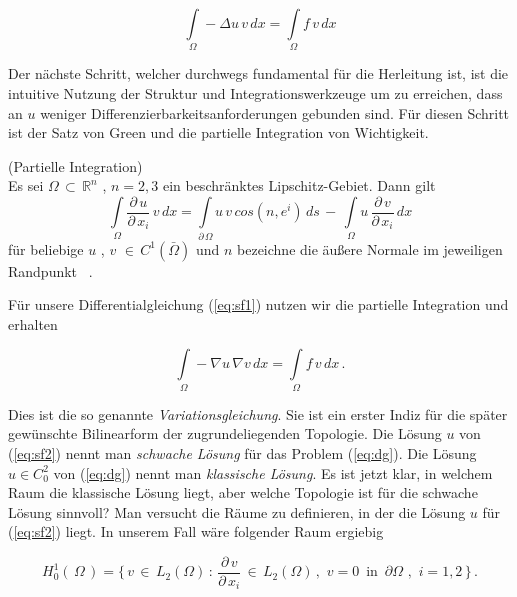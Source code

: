 \begin{equation}
\label{eq:sf1}
\int\limits_{\Omega} - \Delta u \, v  \, dx = \int\limits_{\Omega} f \, v  \, dx
\end{equation}

Der nächste Schritt, welcher durchwegs fundamental für die Herleitung ist, ist die intuitive Nutzung der Struktur und Integrationswerkzeuge um zu erreichen, dass an $u$ weniger Differenzierbarkeitsanforderungen gebunden sind. Für diesen Schritt ist der Satz von Green und die partielle Integration von Wichtigkeit.

\begin{Lemma} (Partielle Integration) \label{lemma:part} \\
Es sei $\Omega \, \subset \, \mathbb{R}^{n}$ , $n=2,3$ ein beschränktes Lipschitz-Gebiet. Dann gilt
\begin{equation*}
\int\limits_{\Omega} \dfrac{\partial \, u}{\partial \, x_i} \, v \, dx = \int\limits_{\partial \, \Omega} u \, v \, cos(n,e^i) \, ds \, - \, \int\limits_{\Omega} u \, \dfrac{\partial \, v}{\partial \, x_i} \, dx
\end{equation*}
für beliebige $u$ , $v$ $\in \, C^1(\bar{\Omega})$ und $n$ bezeichne die äußere Normale im jeweiligen Randpunkt ~\cite[139]{Numerik}.
\end{Lemma}

Für unsere Differentialgleichung (\ref{eq:sf1}) nutzen wir die partielle Integration und erhalten

\begin{equation} \label{eq:sf2}
\int\limits_{\Omega} - \nabla u \, \nabla v \, dx = \int\limits_{\Omega} f \, v \, dx \, .
\end{equation}
  
Dies ist die so genannte \textit{Variationsgleichung}. Sie ist ein erster Indiz für die später gewünschte Bilinearform der zugrundeliegenden Topologie. 
Die Lösung $u$ von (\ref{eq:sf2}) nennt man \textit{schwache Lösung} für das Problem (\ref{eq:dg}).
Die Lösung $u \in C_{0}^{2}$ von (\ref{eq:dg}) nennt man \textit{klassische Lösung}. Es ist jetzt klar, in welchem Raum die klassische Lösung liegt, aber welche Topologie ist für die schwache Lösung sinnvoll? 
Man versucht die Räume zu definieren, in der die Lösung $u$ für (\ref{eq:sf2}) liegt. In unserem Fall wäre folgender Raum ergiebig

\begin{equation*}
	H_{0}^{1}(\, \Omega\, ) = \{ \, v \, \in \, L_{2}(\Omega) \, : \, \dfrac{\partial \, v}{\partial \, x_{i}}  \, \in \, L_{2}(\Omega) \, , \, \, v=0 \, \text{ in } \, \partial \Omega \text{ , } \,  i=1,2 \, \} \, .
\end{equation*}

